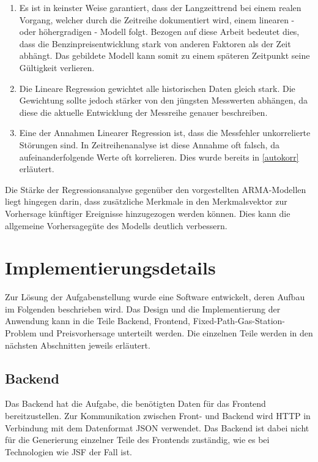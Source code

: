 \documentclass[
ngerman          %
,a4paper          %
,11pt
,pdftex
]{report}
\begin{document}
\begin{enumerate}
	\item Es ist in keinster Weise garantiert, dass der Langzeittrend bei einem realen Vorgang, welcher durch die Zeitreihe dokumentiert wird, einem linearen - oder höhergradigen - Modell folgt. Bezogen auf diese Arbeit bedeutet dies, dass die Benzinpreisentwicklung stark von anderen Faktoren als der Zeit abhängt. Das gebildete Modell kann somit zu einem späteren Zeitpunkt seine Gültigkeit verlieren.
	\item Die Lineare Regression gewichtet alle historischen Daten gleich stark. Die Gewichtung sollte jedoch stärker von den jüngsten Messwerten abhängen, da diese die aktuelle Entwicklung der Messreihe genauer beschreiben.
	\item Eine der Annahmen Linearer Regression ist, dass die Messfehler unkorrelierte Störungen sind. In Zeitreihenanalyse ist diese Annahme oft falsch, da aufeinanderfolgende Werte oft korrelieren. Dies wurde bereits in \autoref{autokorr} erläutert.
\end{enumerate}

Die Stärke der Regressionsanalyse gegenüber den vorgestellten \ac{ARMA}-Modellen liegt hingegen darin, dass zusätzliche Merkmale in den Merkmalsvektor zur Vorhersage künftiger Ereignisse hinzugezogen werden können. Dies kann die allgemeine Vorhersagegüte des Modells deutlich verbessern.


\chapter{Implementierungsdetails}
Zur Lösung der Aufgabenstellung wurde eine Software entwickelt, deren Aufbau im Folgenden beschrieben wird. Das Design und die Implementierung der Anwendung kann in die Teile Backend, Frontend, Fixed-Path-Gas-Station-Problem und Preisvorhersage unterteilt werden. Die einzelnen Teile werden in den nächsten Abschnitten jeweils erläutert.

\section{Backend}
Das Backend hat die Aufgabe, die benötigten Daten für das Frontend bereitzustellen. Zur Kommunikation zwischen Front- und Backend wird  \ac{HTTP} in Verbindung mit dem Datenformat \ac{JSON} verwendet. Das Backend ist dabei nicht für die Generierung einzelner Teile des Frontends zuständig, wie es bei Technologien wie \ac{JSF} der Fall ist.
\end{document}
